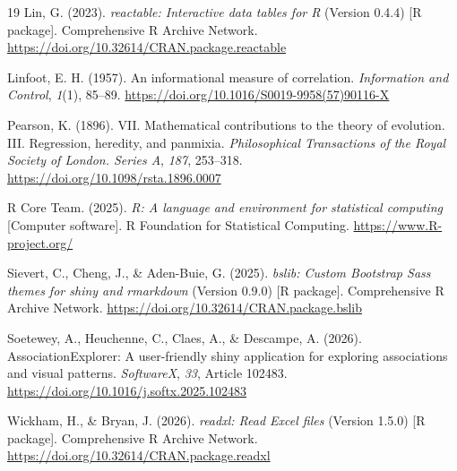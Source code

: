 \documentclass[11pt]{article}
\newcommand{\pkg}[1]{\textsf{#1}}
\newcommand{\proglang}[1]{\textsf{#1}}
\newcommand{\doi}[1]{\href{https://doi.org/#1}{https://doi.org/#1}}
\begin{document}
\begin{thebibliography}{19}
Lin, G. (2023).
\newblock \emph{\pkg{reactable}: Interactive data tables for \proglang{R}}
(Version 0.4.4) [\proglang{R} package].
\newblock Comprehensive \proglang{R} Archive Network. \doi{10.32614/CRAN.package.reactable}

Linfoot, E. H. (1957).
\newblock An informational measure of correlation.
\newblock \emph{Information and Control}, \emph{1}(1), 85--89. \doi{10.1016/S0019-9958(57)90116-X}

Pearson, K. (1896).
\newblock VII. Mathematical contributions to the theory of evolution. III.
Regression, heredity, and panmixia.
\newblock \emph{Philosophical Transactions of the Royal Society of London.
Series A}, \emph{187}, 253--318. \doi{10.1098/rsta.1896.0007}

\bibitem[{\proglang{R} Core Team}(2025)]{R}
{\proglang{R} Core Team}. (2025).
\newblock \emph{\proglang{R}: A language and environment for statistical
computing} [Computer software].
\newblock \proglang{R} Foundation for Statistical Computing. \url{https://www.R-project.org/}

Sievert, C., Cheng, J., \& Aden-Buie, G. (2025).
\newblock \emph{\pkg{bslib}: Custom Bootstrap Sass themes for \pkg{shiny} and
\pkg{rmarkdown}} (Version 0.9.0) [\proglang{R} package].
\newblock Comprehensive \proglang{R} Archive Network. \doi{10.32614/CRAN.package.bslib}

Soetewey, A., Heuchenne, C., Claes, A., \& Descampe, A. (2026).
\newblock AssociationExplorer: A user-friendly \pkg{shiny} application for
exploring associations and visual patterns.
\newblock \emph{SoftwareX}, \emph{33}, Article 102483. \doi{10.1016/j.softx.2025.102483}

Wickham, H., \& Bryan, J. (2026).
\newblock \emph{\pkg{readxl}: Read Excel files} (Version 1.5.0)
[\proglang{R} package].
\newblock Comprehensive \proglang{R} Archive Network. \doi{10.32614/CRAN.package.readxl}

\end{thebibliography}

\newpage
\end{document}
